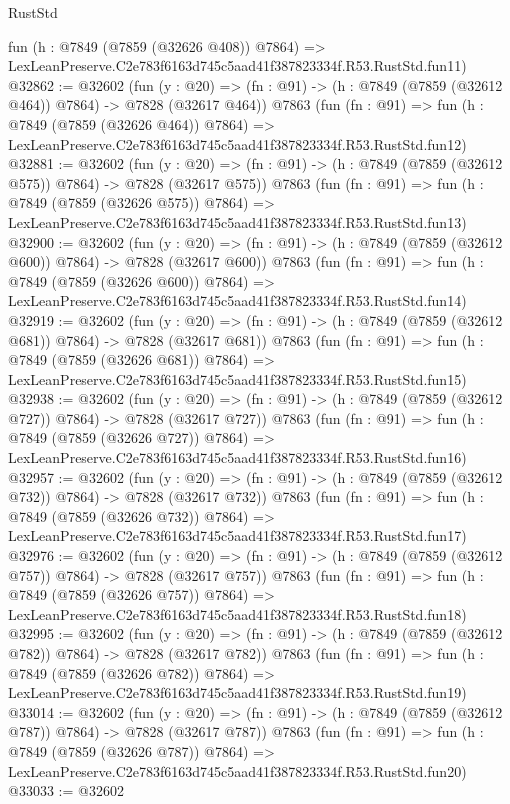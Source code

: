 \begin{lexlean}{RustStd}
\begin{coremodule}
    fun (h : @7849 (@7859 (@32626 @408)) @7864) =>
    LexLeanPreserve.C2e783f6163d745c5aad41f387823334f.R53.RustStd.fun11)
@32862 := @32602
    (fun (y : @20) => (fn : @91) -> (h : @7849 (@7859 (@32612 @464)) @7864) -> @7828 (@32617 @464))
    @7863
    (fun (fn : @91) =>
    fun (h : @7849 (@7859 (@32626 @464)) @7864) =>
    LexLeanPreserve.C2e783f6163d745c5aad41f387823334f.R53.RustStd.fun12)
@32881 := @32602
    (fun (y : @20) => (fn : @91) -> (h : @7849 (@7859 (@32612 @575)) @7864) -> @7828 (@32617 @575))
    @7863
    (fun (fn : @91) =>
    fun (h : @7849 (@7859 (@32626 @575)) @7864) =>
    LexLeanPreserve.C2e783f6163d745c5aad41f387823334f.R53.RustStd.fun13)
@32900 := @32602
    (fun (y : @20) => (fn : @91) -> (h : @7849 (@7859 (@32612 @600)) @7864) -> @7828 (@32617 @600))
    @7863
    (fun (fn : @91) =>
    fun (h : @7849 (@7859 (@32626 @600)) @7864) =>
    LexLeanPreserve.C2e783f6163d745c5aad41f387823334f.R53.RustStd.fun14)
@32919 := @32602
    (fun (y : @20) => (fn : @91) -> (h : @7849 (@7859 (@32612 @681)) @7864) -> @7828 (@32617 @681))
    @7863
    (fun (fn : @91) =>
    fun (h : @7849 (@7859 (@32626 @681)) @7864) =>
    LexLeanPreserve.C2e783f6163d745c5aad41f387823334f.R53.RustStd.fun15)
@32938 := @32602
    (fun (y : @20) => (fn : @91) -> (h : @7849 (@7859 (@32612 @727)) @7864) -> @7828 (@32617 @727))
    @7863
    (fun (fn : @91) =>
    fun (h : @7849 (@7859 (@32626 @727)) @7864) =>
    LexLeanPreserve.C2e783f6163d745c5aad41f387823334f.R53.RustStd.fun16)
@32957 := @32602
    (fun (y : @20) => (fn : @91) -> (h : @7849 (@7859 (@32612 @732)) @7864) -> @7828 (@32617 @732))
    @7863
    (fun (fn : @91) =>
    fun (h : @7849 (@7859 (@32626 @732)) @7864) =>
    LexLeanPreserve.C2e783f6163d745c5aad41f387823334f.R53.RustStd.fun17)
@32976 := @32602
    (fun (y : @20) => (fn : @91) -> (h : @7849 (@7859 (@32612 @757)) @7864) -> @7828 (@32617 @757))
    @7863
    (fun (fn : @91) =>
    fun (h : @7849 (@7859 (@32626 @757)) @7864) =>
    LexLeanPreserve.C2e783f6163d745c5aad41f387823334f.R53.RustStd.fun18)
@32995 := @32602
    (fun (y : @20) => (fn : @91) -> (h : @7849 (@7859 (@32612 @782)) @7864) -> @7828 (@32617 @782))
    @7863
    (fun (fn : @91) =>
    fun (h : @7849 (@7859 (@32626 @782)) @7864) =>
    LexLeanPreserve.C2e783f6163d745c5aad41f387823334f.R53.RustStd.fun19)
@33014 := @32602
    (fun (y : @20) => (fn : @91) -> (h : @7849 (@7859 (@32612 @787)) @7864) -> @7828 (@32617 @787))
    @7863
    (fun (fn : @91) =>
    fun (h : @7849 (@7859 (@32626 @787)) @7864) =>
    LexLeanPreserve.C2e783f6163d745c5aad41f387823334f.R53.RustStd.fun20)
@33033 := @32602

\end{coremodule}
\end{lexlean}
